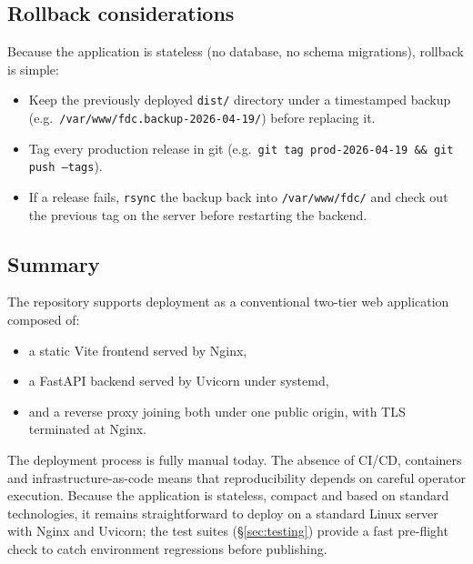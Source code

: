 \documentclass[11pt,a4paper]{article}
\begin{document}
\subsection{Rollback considerations}
\label{subsec:rollback_considerations}

Because the application is stateless (no database, no schema migrations),
rollback is simple:

\begin{itemize}[leftmargin=1.6em]
  \item Keep the previously deployed \texttt{dist/} directory under a
        timestamped backup (e.g.\ \texttt{/var/www/fdc.backup-2026-04-19/})
        before replacing it.
  \item Tag every production release in git
        (e.g.\ \texttt{git tag prod-2026-04-19 \&\& git push --tags}).
  \item If a release fails, \texttt{rsync} the backup back into
        \texttt{/var/www/fdc/} and check out the previous tag on the server
        before restarting the backend.
\end{itemize}

\subsection{Summary}
\label{subsec:deployment_summary}

The repository supports deployment as a conventional two-tier web
application composed of:

\begin{itemize}[leftmargin=1.6em]
  \item a static Vite frontend served by Nginx,
  \item a FastAPI backend served by Uvicorn under systemd,
  \item and a reverse proxy joining both under one public origin, with TLS
        terminated at Nginx.
\end{itemize}

The deployment process is fully manual today. The absence of CI/CD,
containers and infrastructure-as-code means that reproducibility depends on
careful operator execution. Because the application is stateless, compact
and based on standard technologies, it remains straightforward to deploy on
a standard Linux server with Nginx and Uvicorn; the test suites
(\S\ref{sec:testing}) provide a fast pre-flight check to catch environment
regressions before publishing.

\end{document}
